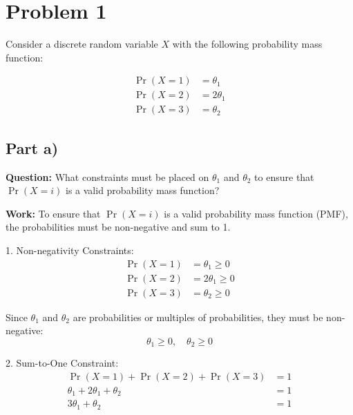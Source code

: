\documentclass{article}
\begin{document}
\thispagestyle{empty}

\begin{center}
\end{center}


\section*{Problem 1}

Consider a discrete random variable $X$ with the following probability mass function:

\begin{align*}
\Pr(X = 1) &= \theta_1 \\
\Pr(X = 2) &= 2\theta_1 \\
\Pr(X = 3) &= \theta_2
\end{align*}

\subsection*{Part a)}

\textbf{Question:} What constraints must be placed on $\theta_1$ and $\theta_2$ to ensure that $\Pr(X = i)$ is a valid probability mass function?

\textbf{Work:}
To ensure that $\Pr(X = i)$ is a valid probability mass function (PMF), the probabilities must be non-negative and sum to 1.

1. Non-negativity Constraints:
   \begin{align*}
   \Pr(X = 1) &= \theta_1 \geq 0 \\
   \Pr(X = 2) &= 2\theta_1 \geq 0 \\
   \Pr(X = 3) &= \theta_2 \geq 0
   \end{align*}

   Since $\theta_1$ and $\theta_2$ are probabilities or multiples of probabilities, they must be non-negative:
   \[ \theta_1 \geq 0, \quad \theta_2 \geq 0 \]

2. Sum-to-One Constraint:
   \begin{align*}
   \Pr(X = 1) + \Pr(X = 2) + \Pr(X = 3) &= 1 \\
   \theta_1 + 2\theta_1 + \theta_2 &= 1 \\
   3\theta_1 + \theta_2 &= 1
   \end{align*}
\end{document}
